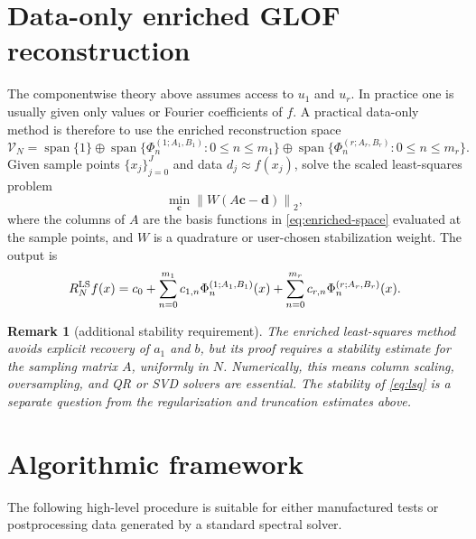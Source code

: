 \documentclass[11pt]{article}
\newtheorem{remark}{Remark}
\newcommand{\cV}{\mathcal{V}}
\DeclareMathOperator{\spanop}{span}
\begin{document}
\section{Data-only enriched GLOF reconstruction}

The componentwise theory above assumes access to $u_1$ and $u_r$.  In practice one is usually given only values or Fourier coefficients of $f$.  A practical data-only method is therefore to use the enriched reconstruction space
\begin{equation}\label{eq:enriched-space}
    \cV_N
    =\spanop\{1\}
    \oplus\spanop\{\Phi_n^{(1;A_1,B_1)}:0\le n\le m_1\}
    \oplus\spanop\{\Phi_n^{(r;A_r,B_r)}:0\le n\le m_r\}.
\end{equation}
Given sample points $\{x_j\}_{j=0}^{J}$ and data $d_j\approx f(x_j)$, solve the scaled least-squares problem
\begin{equation}\label{eq:lsq}
    \min_{\mathbf c}\left\|W(A\mathbf c-\mathbf d)\right\|_2,
\end{equation}
where the columns of $A$ are the basis functions in \eqref{eq:enriched-space} evaluated at the sample points, and $W$ is a quadrature or user-chosen stabilization weight.  The output is
\begin{equation}\label{eq:data-only-recon}
    R_N^{\rm LS}f(x)=c_0+
    \sum_{n=0}^{m_1}c_{1,n}\Phi_n^{(1;A_1,B_1)}(x)
    +\sum_{n=0}^{m_r}c_{r,n}\Phi_n^{(r;A_r,B_r)}(x).
\end{equation}

\begin{remark}[additional stability requirement]
The enriched least-squares method avoids explicit recovery of $a_1$ and $b$, but its proof requires a stability estimate for the sampling matrix $A$, uniformly in $N$.  Numerically, this means column scaling, oversampling, and QR or SVD solvers are essential.  The stability of \eqref{eq:lsq} is a separate question from the regularization and truncation estimates above.
\end{remark}

\section{Algorithmic framework}

The following high-level procedure is suitable for either manufactured tests or postprocessing data generated by a standard spectral solver.
\end{document}
